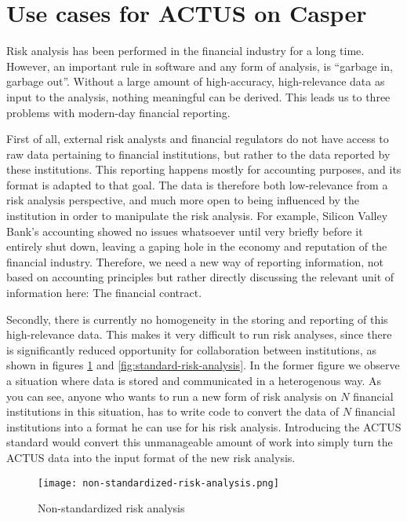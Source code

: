 \documentclass[12pt]{article}
\begin{document}

\section{Use cases for ACTUS on Casper}

Risk analysis has been performed in the financial industry for a long time.
However, an important rule in software and any form of analysis, is ``garbage
in, garbage out''. Without a large amount of high-accuracy, high-relevance data
as input to the analysis, nothing meaningful can be derived. This leads us to
three problems with modern-day financial reporting.

First of all, external risk analysts and financial regulators do not have access
to raw data pertaining to financial institutions, but rather to the data
reported by these institutions. This reporting happens mostly for accounting
purposes, and its format is adapted to that goal. The data is therefore both
low-relevance from a risk analysis perspective, and much more open to being
influenced by the institution in order to manipulate the risk analysis. For
example, Silicon Valley Bank's accounting showed no issues whatsoever until very
briefly before it entirely shut down, leaving a gaping hole in the economy and
reputation of the financial industry. Therefore, we need a new way of reporting
information, not based on accounting principles but rather directly discussing
the relevant unit of information here: The financial contract.

Secondly, there is currently no homogeneity in the storing and reporting of this
high-relevance data. This makes it very difficult to run risk analyses, since
there is significantly reduced opportunity for collaboration between
institutions, as shown in figures \ref{fig:non-standard-risk-analysis} and
\ref{fig:standard-risk-analysis}. In the former figure we observe a situation
where data is stored and communicated in a heterogenous way. As you can see,
anyone who wants to run a new form of risk analysis on $N$ financial
institutions in this situation, has to write code to convert the data of $N$
financial institutions into a format he can use for his risk analysis.
Introducing the ACTUS standard would convert this unmanageable amount of work
into simply turn the ACTUS data into the input format of the new risk analysis.

\begin{figure}
  \centering
  \texttt{[image: non-standardized-risk-analysis.png]}
  \caption{Non-standardized risk analysis}
  \label{fig:non-standard-risk-analysis}
\end{figure}
\end{document}
